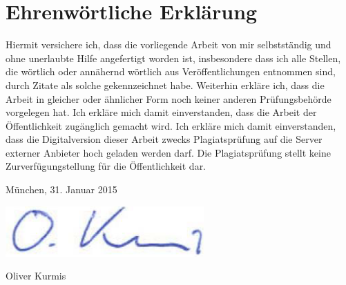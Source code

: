 \newpage

\thispagestyle{empty}

\section*{Ehrenwörtliche Erklärung}  
 
Hiermit  versichere  ich, dass die vorliegende Arbeit von  mir  selbstständig  und 
ohne unerlaubte Hilfe angefertigt worden ist, insbesondere dass ich alle Stellen, 
die wörtlich oder annähernd wörtlich aus Veröffentlichungen entnommen sind, 
durch Zitate als solche gekennzeichnet habe.
Weiterhin erkläre ich, dass die Arbeit in gleicher oder ähnlicher Form noch keiner 
anderen  Prüfungsbehörde  vorgelegen  hat.  Ich  erkläre  mich  damit  einverstanden, 
dass  die  Arbeit  der  Öffentlichkeit  zugänglich  gemacht wird. 
Ich erkläre mich damit einverstanden, dass die Digitalversion dieser 
Arbeit zwecks Plagiatsprüfung auf die Server externer Anbieter hoch geladen 
werden  darf.  Die  Plagiatsprüfung  stellt  keine Zurverfügungstellung  für  die 
Öffentlichkeit dar.
 
München, 31. Januar 2015

\includegraphics[width=.2\textwidth]{img/unterschrift.png}

Oliver Kurmis
